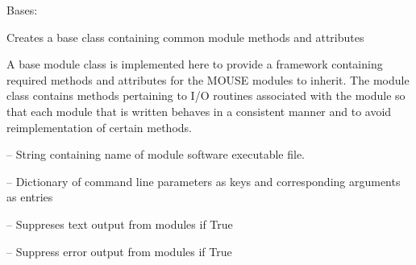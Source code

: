 \documentclass[letterpaper,10pt,english]{sphinxmanual}
\begin{document}
\begin{fulllineitems}
\label{\detokenize{MouseReferenceManual:Modules.Base.ModuleBaseClass}}
Bases: 

Creates a base class containing common module methods and attributes

A base module class is implemented here to provide a framework containing required methods and attributes for the MOUSE modules to inherit. The module class contains methods pertaining to I/O routines associated with the module so that each module that is written behaves in a consistent manner and to avoid reimplementation of certain methods.

\begin{fulllineitems}
\label{\detokenize{MouseReferenceManual:Modules.Base.ModuleBaseClass.program}}
 -- String containing name of module software executable file.

\end{fulllineitems}


\begin{fulllineitems}
\label{\detokenize{MouseReferenceManual:Modules.Base.ModuleBaseClass.parameters}}
 -- Dictionary of command line parameters as keys and corresponding arguments as entries

\end{fulllineitems}


\begin{fulllineitems}
\label{\detokenize{MouseReferenceManual:Modules.Base.ModuleBaseClass.suppressText}}
 -- Suppreses text output from modules if True

\end{fulllineitems}


\begin{fulllineitems}
\label{\detokenize{MouseReferenceManual:Modules.Base.ModuleBaseClass.suppressErrors}}
 -- Suppress error output from modules if True


\end{fulllineitems}
\end{fulllineitems}
\end{document}
